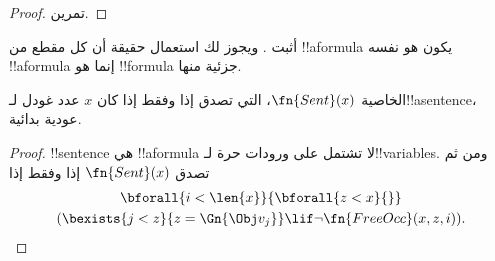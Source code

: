 \documentclass[../../../include/open-logic-section]{subfiles}
\begin{document}
\begin{proof}
تمرين.
\end{proof}

\begin{prob}
أثبت . ويجوز لك استعمال حقيقة
أن كل مقطع من !!a{formula} يكون هو نفسه !!a{formula} إنما هو
!!{formula} جزئية منها.
\end{prob}

\begin{prop}
الخاصية $\fn{Sent}(x)$، التي تصدق إذا وفقط إذا كان $x$ عدد غودل
لـ!!a{sentence}، عودية بدائية.
\end{prop}

\begin{proof}
!!{sentence} هي !!a{formula} لا تشتمل على ورودات حرة لـ!!{variable}s.
ومن ثم تصدق $\fn{Sent}(x)$ إذا وفقط إذا
\begin{multline*}
\bforall{i<\len{x}}{\bforall{z<x}{}}\\
(\bexists{j<z}{z=\Gn{\Obj v_j}} \lif \lnot\fn{FreeOcc}(x,z,i)).
\end{multline*}
\end{proof}
\end{document}
